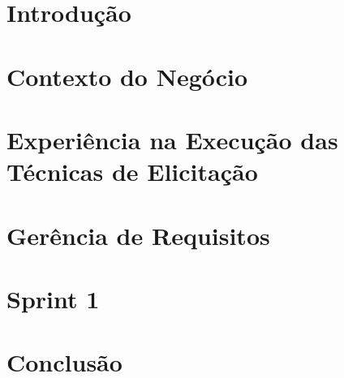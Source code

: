 \chapter{Introdução}


\chapter{Contexto do Negócio}


\chapter{Experiência na Execução das Técnicas de  Elicitação}


\chapter{Gerência de Requisitos}


\chapter{Sprint 1}


\chapter{Conclusão}

